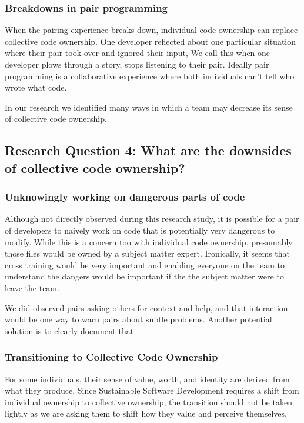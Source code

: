 \subsubsection{Breakdowns in pair programming }
When the pairing experience breaks down, individual code ownership can replace collective code ownership.  One developer reflected about one particular situation where their pair took over and ignored their input,  We call this   when one developer plows through a story, stops listening to their pair. Ideally pair programming is a collaborative experience where both individuals can't tell who wrote what code. 

In our research we identified many ways in which a team may decrease its sense of collective code ownership.
\subsection{Research Question 4: What are the downsides of collective code ownership?}
\subsubsection{Unknowingly working on dangerous parts of code}
Although not directly observed during this research study, it is possible for a pair of developers to naively work on code that is potentially very dangerous to modify. While this is a concern too with individual code ownership, presumably those files would be owned by a subject matter expert. Ironically, it seems that cross training would be very important and enabling everyone on the team to understand the dangers would be important if the the subject matter were to leave the team.  

We did observed pairs asking others for context and help, and that interaction would be one way to warn pairs about subtle problems. Another potential solution is to clearly document that  

\subsubsection{Transitioning to Collective Code Ownership}
For some individuals, their sense of value, worth, and identity are derived from what they produce. Since Sustainable Software Development requires a shift from individual ownership to collective ownership, the transition should not be taken lightly as we are asking them to shift how they value and perceive themselves. 

